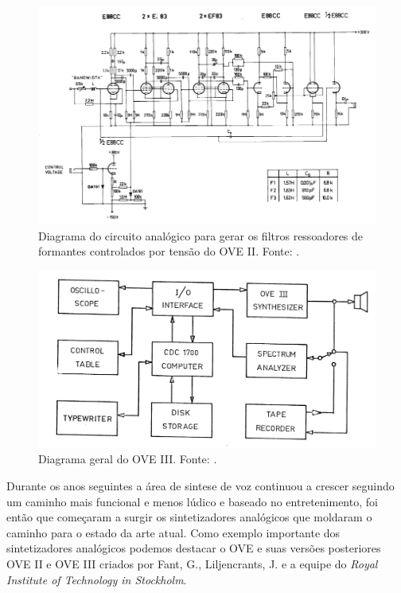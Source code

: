 \documentclass[
  12pt,       
  openright,      
  twoside,      
  a4paper,      
  english,      
  french,       
  spanish,      
  brazil,     
  ]{abntex2}
\begin{document}
\begin{figure}
\includegraphics[width=\textwidth,keepaspectratio]{imagens/diagrama_polo_oveII.PNG}
\caption{Diagrama do circuito analógico para gerar os filtros ressoadores de formantes controlados por tensão do OVE II. Fonte: .}
\label{fig:oveIIdiagram}
\end{figure}

\begin{figure}
\includegraphics[width=\textwidth,keepaspectratio]{imagens/diagrama_geral_oveIII.PNG}
\caption{Diagrama geral do OVE III. Fonte: .}
\label{fig:oveIIIdiagram}
\end{figure}

Durante os anos seguintes a área de sintese de voz continuou a crescer seguindo um caminho mais funcional e menos lúdico e baseado no entretenimento, foi então que começaram a surgir os sintetizadores analógicos que moldaram o caminho para o estado da arte atual. Como exemplo importante dos sintetizadores analógicos podemos destacar o OVE \cite{hartmut_traunmuller_history} e suas versões posteriores OVE II \cite{fant_g._speech} e OVE III \cite{liljencrants_j._ove} criados por Fant, G., Liljencrants, J. e a equipe do \textit{Royal Institute of Technology in Stockholm}.
\end{document}

